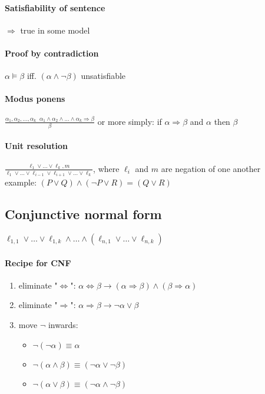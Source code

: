 \begin{multicols}{4}
\paragraph{Satisfiability of sentence} $\Rightarrow$ true in some model
\paragraph{Proof by contradiction} $\alpha \models \beta$ iff. $(\alpha \land \lnot \beta)$ unsatisfiable
\paragraph{Modus ponens}
$\frac{\alpha_1, \alpha_2, \dots, \alpha_k \;\; \alpha_1 \land \alpha_2 \land \dots \land \alpha_k \Rightarrow \beta}{\beta}$ or more simply: if $\alpha \Rightarrow \beta$ and $\alpha$ then $\beta$
\paragraph{Unit resolution}

$\frac{\ell_1 \lor \dots \lor \ell_k, m}{\ell_1 \lor \dots \lor \ell_{i-1} \lor \ell_{i+1} \lor \dots \lor \ell_{k}}$, where $\ell_i$ and $m$ are negation of one another \\
example: $(P \lor Q) \land (\lnot P \lor R) = (Q \lor R)$

\subsection{Conjunctive normal form}
$\ell_{1,1} \lor \dots \lor \ell_{1,k} \land \dots \land (\ell_{n,1} \lor \dots \lor \ell_{n,k})$

\paragraph{Recipe for CNF}
\begin{enumerate}
\item eliminate "$\Leftrightarrow$": $\alpha \Leftrightarrow \beta \rightarrow (\alpha \Rightarrow \beta) \land (\beta \Rightarrow \alpha)$
\item eliminate "$\Rightarrow$": $\alpha \Rightarrow \beta \rightarrow \lnot \alpha \lor \beta$
\item move $\lnot$ inwards:
	\begin{itemize}
	\item $\lnot(\lnot \alpha) \equiv \alpha$
	\item $\lnot(\alpha \land \beta) \equiv (\lnot \alpha \lor \lnot \beta)$
	\item $\lnot(\alpha \lor \beta) \equiv (\lnot \alpha \land \lnot \beta)$
	\end{itemize}
\end{enumerate}


\end{multicols}
